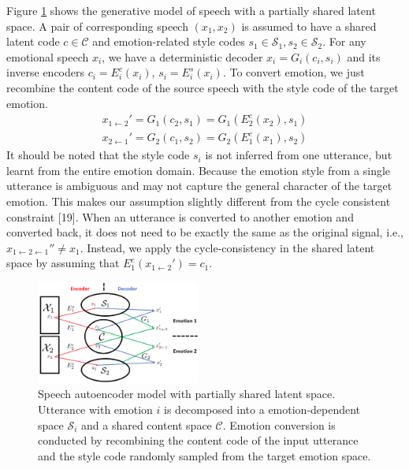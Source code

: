 \documentclass{article}
\begin{document}
Figure \ref{autoencoder} shows the generative model of speech with a partially shared latent space. A pair of corresponding speech $(x_1, x_2)$ is assumed to have a shared latent code $c \in \mathcal{C}$ and emotion-related style codes $s_1 \in \mathcal{S}_1, s_2 \in \mathcal{S}_2$. For any emotional speech $x_i$, we have a deterministic decoder $x_i = G_i(c_i,s_i)$ and its inverse encoders $c_i = E_i^c(x_i)$, $s_i = E_i^s(x_i)$. To convert emotion, we just recombine the content code of the source speech with the style code of the target emotion.
\begin{equation}
\begin{aligned}
x_{1\leftarrow2}' = G_1(c_2, s_1) = G_1(E_2^c(x_2), s_1) \\
x_{2\leftarrow1}' = G_2(c_1, s_2) = G_2(E_1^c(x_1), s_2)
\end{aligned}
\end{equation}
It should be noted that the style code $s_i$ is not inferred from one utterance, but learnt from the entire emotion domain. Because the emotion style from a single utterance is ambiguous and may not capture the general character of the target emotion. This makes our assumption slightly different from the cycle consistent constraint [19]. When an utterance is converted to another emotion and converted back, it does not need to be exactly the same as the original signal, i.e., $x_{1\leftarrow2\leftarrow1}'' \neq x_1$. Instead, we apply the cycle-consistency in the shared latent space by assuming that $E_1^c(x_{1\leftarrow2}') = c_1$.

\begin{figure}[htb]
\includegraphics[width=0.48\textwidth]{FIG/autoencoder}
\caption{Speech autoencoder model with partially shared latent space. Utterance with emotion $i$ is decomposed into a emotion-dependent space $\mathcal{S}_i$ and a shared content space $\mathcal{C}$. Emotion conversion is conducted by recombining the content code of the input utterance and the style code randomly sampled from the target emotion space.}
\label{autoencoder}
\end{figure}
\end{document}
